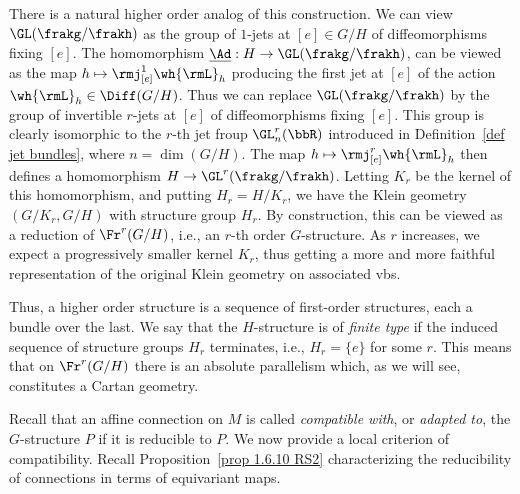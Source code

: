 \begin{rem}
    There is a natural higher order analog of this construction. We can view $\GL(\frakg\slash\frakh)$ as the group of $1$-jets at $[e]\in G\slash H$ of diffeomorphisms fixing $[e]$. The homomorphism $\underline{\Ad}:H\to \GL(\frakg\slash\frakh)$, can be viewed as the map $h\mapsto \rmj^1_{[e]}\wh{\rmL}_h$ producing the first jet at $[e]$ of the action $\wh{\rmL}_h\in\Diff(G\slash H)$. Thus we can replace $\GL(\frakg\slash\frakh)$ by the group of invertible $r$-jets at $[e]$ of diffeomorphisms fixing $[e]$. This group is clearly isomorphic to the $r$-th jet froup $\GL^r_n(\bbR)$ introduced in Definition~\ref{def jet bundles}, where $n=\dim(G\slash H)$. The map $h\mapsto \rmj^r_{[e]}\wh{\rmL}_h$ then defines a homomorphism $H\to \GL^r(\frakg\slash\frakh)$. Letting $K_r$ be the kernel of this homomorphism, and putting $H_r=H\slash K_r$, we have the Klein geometry $(G\slash K_r,G\slash H)$ with structure group $H_r$. By construction, this can be viewed as a reduction of $\Fr^r(G\slash H)$, i.e., an $r$-th order $G$-structure. As $r$ increases, we expect a progressively smaller kernel $K_r$, thus getting a more and more faithful representation of the original Klein geometry on associated \glspl{vb}.

    Thus, a higher order structure is a sequence of first-order structures, each a bundle over the last. We say that the $H$-structure is of \emph{finite type} if the induced sequence of structure groups $H_r$ terminates, i.e., $H_r=\{e\}$ for some $r$. This means that on $\Fr^r(G\slash H)$ there is an absolute parallelism which, as we will see, constitutes a Cartan geometry.
\end{rem}


Recall that an affine connection on $M$ is called \emph{compatible with}, or \emph{adapted to}, the $G$-structure $P$ if it is reducible to $P$. We now provide a local criterion of compatibility. Recall Proposition~\ref{prop 1.6.10 RS2} characterizing the reducibility of connections in terms of equivariant maps. 


